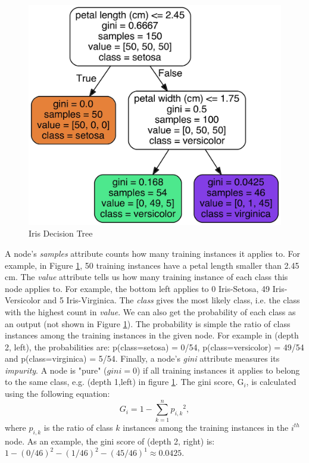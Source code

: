 \documentclass[12pt]{article}
\numberwithin{figure}{section}
\begin{document}
\begin{figure}[H]
\centering
\includegraphics[width=0.8\linewidth]{decision-tree-iris.jpg}
\caption{Iris Decision Tree}
\label{figT:iris_tree}
\end{figure}
\noindent
A node's \textit{samples} attribute counts how many training instances it applies to. For example, in Figure \ref{figT:iris_tree}, 50 training instances have a petal length smaller than 2.45 cm. The \textit{value} attribute tells us how many training instance of each class this node applies to. For example, the bottom left applies to 0 Iris-Setosa, 49 Iris-Versicolor and 5 Iris-Virginica. The \textit{class} gives the most likely class, i.e. the class with the highest count in \textit{value}. We can also get the probability of each class as an output (not shown in Figure \ref{figT:iris_tree}). The probability is simple the ratio of class instances among the training instances in the given node. For example in (depth 2, left), the probabilities are: p(class=setosa) = 0/54, p(class=versicolor) = 49/54 and p(class=virginica) = 5/54. Finally, a node's \textit{gini} attribute measures its \textit{impurity}. A node is "pure" ($gini=0$) if all training instances it applies to belong to the same class, e.g. (depth 1,left) in figure \ref{figT:iris_tree}. The gini score, G$_i$, is calculated using the following equation:
\begin{equation}
G_i = 1 - \sum_{k=1}^{n}{p_{i,k}}^2,
\label{eqT:gini_score}
\end{equation}
where $p_{i,k}$ is the ratio of class $k$ instances among the training instances in the $i^{th}$ node. As an example, the gini score of (depth 2, right) is: $1-(0/46)^2-(1/46)^2-(45/46)^1 \approx 0.0425$. \\ \\
\end{document}
